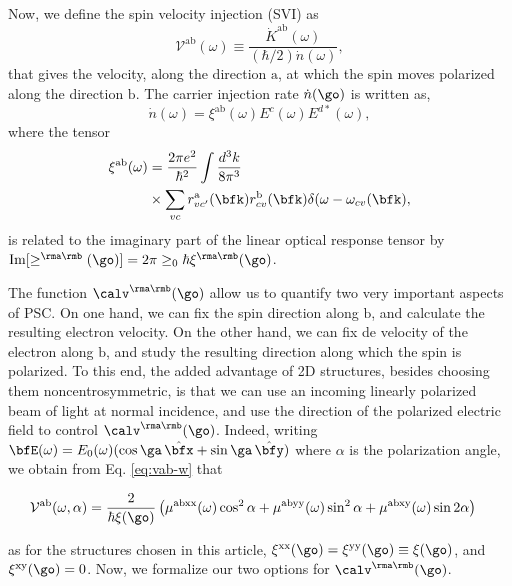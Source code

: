 \documentclass[prb,11pt,tightenlines,twocolumn,aps]{revtex4-1}
\begin{document}
Now, we define the spin velocity injection (SVI) as
\begin{equation}\label{eq:vab-w}
\mathcal{V}^{\mathrm{ab}}(\omega) \equiv
\frac{\dot{K}^{\mathrm{ab}}(\omega)}{(\hbar/2) \dot{n}(\omega)},
\end{equation}  
that gives the velocity, along the direction $\mathrm{a}$, at which the spin
moves polarized along the direction $\mathrm{b}$. The carrier injection rate
$\dot n(\go)$ is written as,\cite{nastosPRB05}
\begin{equation}
\dot{n}(\omega) =
\xi^{\mathrm{ab}}(\omega) E^{c }(\omega) E^{d*}(\omega),
\label{eq:dotn}
\end{equation}
where the tensor 
\begin{equation}\label{eq:xi}
\begin{aligned}
\xi^{\mathrm{ab}}(\omega)
&
=
\frac{2\pi e^{2}}{\hbar^{2}} \int 
\frac{d^{3}k}{8 \pi^{3}}
\\\nonumber
&\times \sum_{vc}
r^{\mathrm{a}}_{vc'}(\bfk)  
r^{\mathrm{b}}_{cv }(\bfk)  
\delta(\omega-\omega_{cv}(\bfk) 
, 
\end{aligned}
\end{equation}
is related to the imaginary part of the linear optical 
response tensor by
$\mathrm{Im}[\ge^{\rma\rmb}(\go)]=2\pi\ge_0\hbar\xi^{\rma\rmb}(\go)$.

The function $\calv^{\rma\rmb}(\go)$ allow us to quantify two very
important aspects of PSC. On one hand, we can fix the spin direction
along $\mathrm{b}$,   
and calculate the resulting electron velocity.  
On the other hand, we can fix de velocity of the electron
along $\mathrm{b}$,  and study the resulting direction along which the
spin is polarized.
To this end, the added advantage of  2D structures, besides choosing
them noncentrosymmetric, is that we can use an incoming linearly
polarized beam of light
at normal incidence, and use the  direction of the polarized  electric
field to control $\calv^{\rma\rmb}(\go)$.
Indeed, writing 
$\bfE(\omega) = E_0(\omega)(\cos\ga\,\hat\bfx+\sin\ga\,\hat\bfy)$
where $\alpha$ is the polarization angle, we obtain from
 Eq. \eqref{eq:vab-w}
that
\begin{widetext}
\begin{align}
\mathcal{V}^{\mathrm{ab}}(\omega,\alpha)
&= 
\frac{2}{\hbar\xi(\go)}
\left(\mu^{\mathrm{abxx}}(\omega)\cos^{2}\alpha + 
\mu^{\mathrm{abyy}}(\omega)\sin^{2}\alpha + 
\mu^{\mathrm{abxy}}(\omega)\sin 2\alpha\right)
\label{eq:vab-aw}
\end{align}
\end{widetext}
as for the structures chosen in this article,
$\xi^{\mathrm{xx}}(\go)=\xi^{\mathrm{yy}}(\go)\equiv\xi(\go)$, and $\xi^{\mathrm{xy}}(\go)=0$.
Now, we formalize our two options for $\calv^{\rma\rmb}(\go)$.
\end{document}

